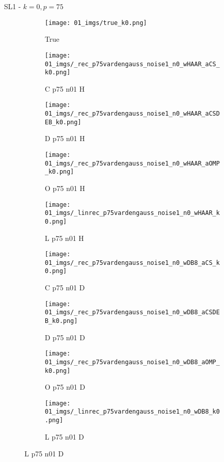 \begin{frame}{SL1 - $k=0,p=75$}{}
\begin{figure}
\begin{subfigure}{0.1\textwidth}
\texttt{[image: 01\_imgs/true\_k0.png]}
\caption*{\Tiny True}
\end{subfigure}
\begin{subfigure}{0.1\textwidth}
\texttt{[image: 01\_imgs/\_rec\_p75vardengauss\_noise1\_n0\_wHAAR\_aCS\_k0.png]}
\caption*{\Tiny C p75 n01 H}
\end{subfigure}
\begin{subfigure}{0.1\textwidth}
\texttt{[image: 01\_imgs/\_rec\_p75vardengauss\_noise1\_n0\_wHAAR\_aCSDEB\_k0.png]}
\caption*{\Tiny D p75 n01 H}
\end{subfigure}
\begin{subfigure}{0.1\textwidth}
\texttt{[image: 01\_imgs/\_rec\_p75vardengauss\_noise1\_n0\_wHAAR\_aOMP\_k0.png]}
\caption*{\Tiny O p75 n01 H}
\end{subfigure}
\begin{subfigure}{0.1\textwidth}
\texttt{[image: 01\_imgs/\_linrec\_p75vardengauss\_noise1\_n0\_wHAAR\_k0.png]}
\caption*{\Tiny L p75 n01 H}
\end{subfigure}
\begin{subfigure}{0.1\textwidth}
\texttt{[image: 01\_imgs/\_rec\_p75vardengauss\_noise1\_n0\_wDB8\_aCS\_k0.png]}
\caption*{\Tiny C p75 n01 D}
\end{subfigure}
\begin{subfigure}{0.1\textwidth}
\texttt{[image: 01\_imgs/\_rec\_p75vardengauss\_noise1\_n0\_wDB8\_aCSDEB\_k0.png]}
\caption*{\Tiny D p75 n01 D}
\end{subfigure}
\begin{subfigure}{0.1\textwidth}
\texttt{[image: 01\_imgs/\_rec\_p75vardengauss\_noise1\_n0\_wDB8\_aOMP\_k0.png]}
\caption*{\Tiny O p75 n01 D}
\end{subfigure}
\begin{subfigure}{0.1\textwidth}
\texttt{[image: 01\_imgs/\_linrec\_p75vardengauss\_noise1\_n0\_wDB8\_k0.png]}
\caption*{\Tiny L p75 n01 D}
\end{subfigure}

\vspace{5pt}


\end{figure}
\end{frame}
